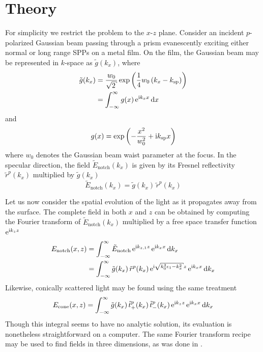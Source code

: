 \section{Theory} \label{sec:interferencetheory}
For simplicity we restrict the problem to the $x$-$z$ plane.  Consider an
incident $p$-polarized Gaussian beam passing through a prism evanescently
exciting either normal or long range SPPs on a metal film.  On the film,
the Gaussian beam may be represented in $k$-space as $\tilde{g}(k_x)$,
where
\begin{align}
\tilde{g}(k_x) &= \frac{w_0}{\sqrt{2}} \exp\left(\frac{1}{4}w_0\left(k_x - \ksp\right)\right)\\
&= \intinfty g(x)\, \me^{\mi k_x x} \md x
\end{align}
and
\begin{equation}
g(x) = \exp\left(-\frac{x^2}{w_0^2} + {\mathrm{i}} k_\mathrm{sp} x\right)
\end{equation}
where $w_0$ denotes the Gaussian beam waist parameter at the focus.  In the
specular direction, the field $\tilde{E}_\mathrm{notch}(k_x)$ is given by its
Fresnel reflectivity $\tilde{r}^p(k_x)$ multiplied by $\tilde{g}(k_x)$
\begin{equation}
\tilde{E}_\mathrm{notch}(k_x)=\tilde{g}(k_x)\,\tilde{r}^p(k_x)
\end{equation}

Let us now consider the spatial evolution of the light as it propagates
away from the surface.
The complete field in both $x$ and $z$ can be obtained by computing
the Fourier transform of $\tilde{E}_\mathrm{notch}(k_x)$ multiplied 
by a free space transfer function ${\mathrm{e}}^{{\mathrm{i}} k_{z} z}$
\begin{align}
E_\mathrm{notch}(x,z) &= \intinfty \tilde{E}_\mathrm{notch}\, \me^{\mi k_{z,1} z}\, \me^{\mi k_x x} \md k_x\\
 &= \intinfty \tilde{g}(k_x)\, \tilde{r}^p(k_x)\, \me^{\mi \sqrt{k_0^2 \epsilon_1 - k_x^2}z}\, \me^{\mi k_x x} \md k_x
\label{eqn:fourier123}
\end{align}
Likewise, conically scattered light may be found using the same treatment
\begin{align}
E_\text{cone}(x,z) = \int_{-\infty}^{\infty} \tilde{g}(k_x)\, 
\tilde{t}^p_+(k_x)\, \tilde{t}^p_-(k_x)\,{\mathrm{e}}^{{\mathrm{i}} k_z z}\, {\mathrm{e}}^{{\mathrm{i}} k_x x} \,\mathrm{d} k_x
\label{eqn:fourier321}
\end{align}
Though this integral seems to have no analytic solution, its evaluation is
nonetheless straightforward on a computer.  The same Fourier transform
recipe may be used to find fields in three dimensions, as was done in
.

